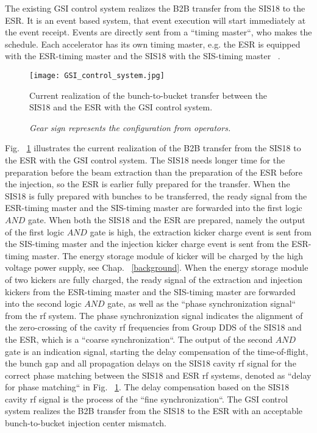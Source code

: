 The existing GSI control system realizes the B2B transfer from the SIS18 to the ESR. It is an event based system, that event execution will start immediately at the event receipt. Events are directly sent from a ``timing master``, who makes the schedule. Each accelerator has its own timing master, e.g. the ESR is equipped with the ESR-timing master and the SIS18 with the SIS-timing master ~\cite{kainberger_pzs_2003, krause_re-engineering_2001}.
\begin{figure}[H]
   \centering   
   \texttt{[image: GSI\_control\_system.jpg]}
   \caption{Current realization of the bunch-to-bucket transfer between the SIS18 and the ESR with the GSI control system.}
	\caption*{\textsl{\small{Gear sign represents the configuration from operators.}}}
   \label{GSI_control_system}
\end{figure}
Fig. ~\ref{GSI_control_system} illustrates the current realization of the B2B transfer from the SIS18 to the ESR with the GSI control system. The SIS18 needs longer time for the preparation before the beam extraction than the preparation of the ESR before the injection, so the ESR is earlier fully prepared for the transfer. When the SIS18 is fully prepared with bunches to be transferred, the ready signal from the ESR-timing master and the SIS-timing master are forwarded into the first logic $\textit{AND}$ gate. When both the SIS18 and the ESR are prepared, namely the output of the first logic $\textit{AND}$ gate is high, the extraction kicker charge event is sent from the SIS-timing master and the injection kicker charge event is sent from the ESR-timing master. The energy storage module of kicker will be charged by the high voltage power supply, see Chap. ~\ref{background}. When the energy storage module of two kickers are fully charged, the ready signal of the extraction and injection kickers from the ESR-timing master and the SIS-timing master are forwarded into the second logic $\textit{AND}$ gate, as well as the ``phase synchronization signal`` from the rf system. The phase synchronization signal indicates the alignment of the zero-crossing of the cavity rf frequencies from Group DDS of the SIS18 and the ESR, which is a ``coarse synchronization``. The output of the second $\textit{AND}$ gate is an indication signal, starting the delay compensation of the time-of-flight, the bunch gap and all propagation delays on the SIS18 cavity rf signal for the correct phase matching between the SIS18 and ESR rf systems, denoted as ``delay for phase matching`` in Fig. ~\ref{GSI_control_system}. The delay compensation based on the SIS18 cavity rf signal is the process of the ``fine synchronization``. The GSI control system realizes the B2B transfer from the SIS18 to the ESR with an acceptable bunch-to-bucket injection center mismatch.

